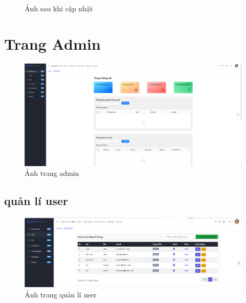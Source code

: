 \FloatBarrier %

\begin{figure}[H]
    \centering
    \caption{Ảnh sau khi cập nhật}
\end{figure}

\FloatBarrier %

\section{Trang Admin}
\begin{figure}[H]
    \centering
    \includegraphics[width=1\textwidth]{img/instagram/trang_admin.png}
    \caption{Ảnh trang admin}
\end{figure}

\FloatBarrier %
\subsection{quản lí user}
\begin{figure}[H]
    \centering
    \includegraphics[width=1\textwidth]{img/instagram/trang_quản_lí_user.png}
    \caption{Ảnh trang quản lí user}
\end{figure}

\FloatBarrier %

